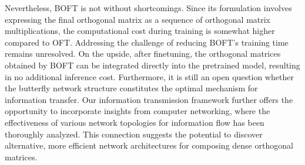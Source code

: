 Nevertheless, BOFT is not without shortcomings. Since its formulation involves expressing the final orthogonal matrix as a sequence of orthogonal matrix multiplications, the computational cost during training is somewhat higher compared to OFT. Addressing the challenge of reducing BOFT’s training time remains unresolved. On the upside, after finetuning, the orthogonal matrices obtained by BOFT can be integrated directly into the pretrained model, resulting in no additional inference cost. Furthermore, it is still an open question whether the butterfly network structure constitutes the optimal mechanism for information transfer. Our information transmission framework further offers the opportunity to incorporate insights from computer networking, where the effectiveness of various network topologies for information flow has been thoroughly analyzed. This connection suggests the potential to discover alternative, more efficient network architectures for composing dense orthogonal matrices.

